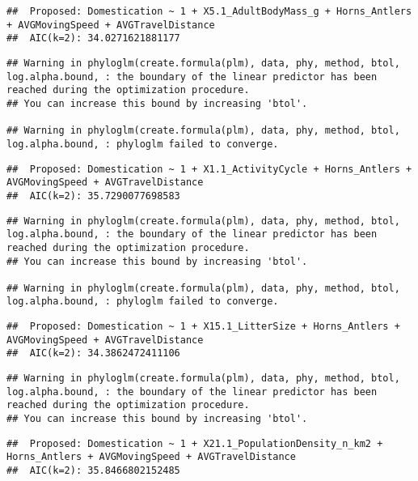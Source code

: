 \documentclass[
]{article}
\begin{document}
\begin{verbatim}
##  Proposed: Domestication ~ 1 + X5.1_AdultBodyMass_g + Horns_Antlers + AVGMovingSpeed + AVGTravelDistance
##  AIC(k=2): 34.0271621881177
\end{verbatim}

\begin{verbatim}
## Warning in phyloglm(create.formula(plm), data, phy, method, btol, log.alpha.bound, : the boundary of the linear predictor has been reached during the optimization procedure.
## You can increase this bound by increasing 'btol'.

## Warning in phyloglm(create.formula(plm), data, phy, method, btol, log.alpha.bound, : phyloglm failed to converge.
\end{verbatim}

\begin{verbatim}
##  Proposed: Domestication ~ 1 + X1.1_ActivityCycle + Horns_Antlers + AVGMovingSpeed + AVGTravelDistance
##  AIC(k=2): 35.7290077698583
\end{verbatim}

\begin{verbatim}
## Warning in phyloglm(create.formula(plm), data, phy, method, btol, log.alpha.bound, : the boundary of the linear predictor has been reached during the optimization procedure.
## You can increase this bound by increasing 'btol'.

## Warning in phyloglm(create.formula(plm), data, phy, method, btol, log.alpha.bound, : phyloglm failed to converge.
\end{verbatim}

\begin{verbatim}
##  Proposed: Domestication ~ 1 + X15.1_LitterSize + Horns_Antlers + AVGMovingSpeed + AVGTravelDistance
##  AIC(k=2): 34.3862472411106
\end{verbatim}

\begin{verbatim}
## Warning in phyloglm(create.formula(plm), data, phy, method, btol, log.alpha.bound, : the boundary of the linear predictor has been reached during the optimization procedure.
## You can increase this bound by increasing 'btol'.
\end{verbatim}

\begin{verbatim}
##  Proposed: Domestication ~ 1 + X21.1_PopulationDensity_n_km2 + Horns_Antlers + AVGMovingSpeed + AVGTravelDistance
##  AIC(k=2): 35.8466802152485
\end{verbatim}
\end{document}
